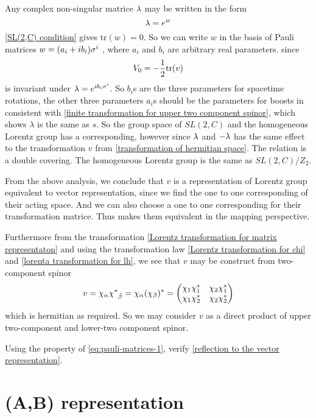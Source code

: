 Any complex non-singular matrice $\lambda$ may be written in the form
\begin{equation}
    \lambda = e^{w}
\end{equation}
 \eqref{SL(2,C) condition} gives $\text{tr}(w) = 0$. So we can write $w$ in the basis of Pauli matrices $w = (a_i+i b_i)\sigma^{i}$ , where $a_i$ and $b_i$ are arbitrary real parameters. since
\begin{equation}
    V_0 = -\frac{1}{2}\text{tr}(v)
\end{equation}
is invariant under $\lambda = e^{i b_i\sigma^{i}}$. So $b_i$s are the three parameters for spacetime rotations, the other three parameters $a_i$s should be the parameters for boosts in consistent with \eqref{finite transformation for upper two component spinor}, which shows $\lambda$ is the same as $s$. So the group space of $SL(2,C)$ and the homogeneous Lorentz group has a corresponding, however since $\lambda$ and $-\lambda$ has the same effect to the transformation $v$ from \eqref{transformation of hermitian space}. The relation is a double covering. The homogeneous Lorentz group is the same as $SL(2,C)/Z_2$.

From the above analysis, we conclude that $v$ is a representation of Lorentz group equivalent to vector representation, since we find the one to one corresponding of their acting space. And we can also choose a one to one corresponding for their transformation matrice. Thus makes them equivalent in the mapping perspective.

Furthermore from the transformation \eqref{Lorentz transformation for matrix representaton} and using the transformation law \eqref{Lorentz transformation for chi} and \eqref{lorenta transformation for lh}, we see that $v$ may be construct from two-component spinor
\begin{equation}
  v = \chi_\a \lc_{\dob}=\chi_\a(\chi_{\be})^*
=\mqty(\chi_1\chi_1^* & \chi_2\chi_1^*
  \\\chi_1\chi_2^* & \chi_2\chi_2^*)
\end{equation}
which is hermitian as required. So we may consider $v$ as a direct product of upper two-component and lower-two component spinor.

\begin{Exe}
Using the property of \eqref{eq:pauli-matrices-1}, verify \eqref{reflection to the vector representation}.
\end{Exe}

\section{(A,B) representation}

